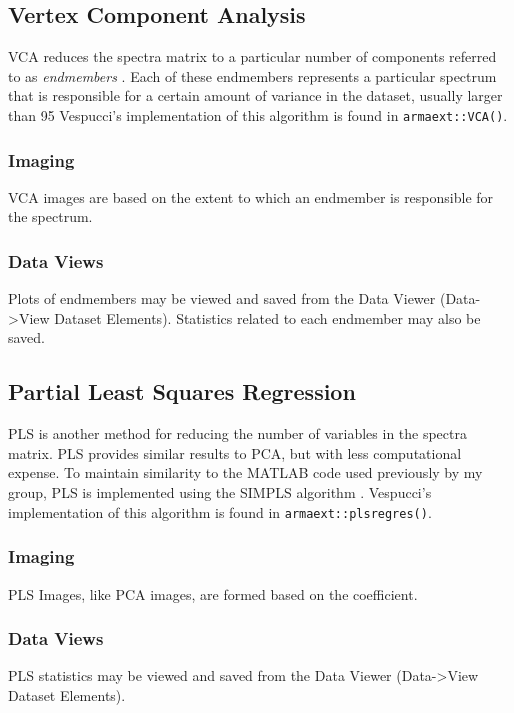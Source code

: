 \documentclass[12pt]{achemso} %
\begin{document}
\subsection{Vertex Component Analysis} VCA reduces the spectra matrix to a
particular number of components referred to as \emph{endmembers}
\cite{Nascimento2005}. Each of these endmembers represents a particular spectrum
that is responsible for a certain amount of variance in the dataset, usually
larger than 95%
Vespucci's implementation of this algorithm is found in
\texttt{arma\textunderscore ext::VCA()}.

\subsubsection{Imaging} VCA images are based on the extent to which an endmember
is responsible for the spectrum.

\subsubsection{Data Views} Plots of endmembers may be viewed and saved from the
Data Viewer (Data->View Dataset Elements). Statistics related to each endmember
may also be saved.

\subsection{Partial Least Squares Regression} PLS is another method for reducing
the number of variables in the spectra matrix. PLS provides similar results to
PCA, but with less computational expense. To maintain similarity to the MATLAB
code used previously by my group, PLS is implemented using the SIMPLS algorithm
\cite{deJong1993}. Vespucci's implementation of this algorithm is found in
\texttt{arma\textunderscore ext::plsregres()}.

\subsubsection{Imaging} PLS Images, like PCA images, are formed based on the
coefficient.

\subsubsection{Data Views} PLS statistics may be viewed and saved from the Data
Viewer (Data->View Dataset Elements).
\end{document}
